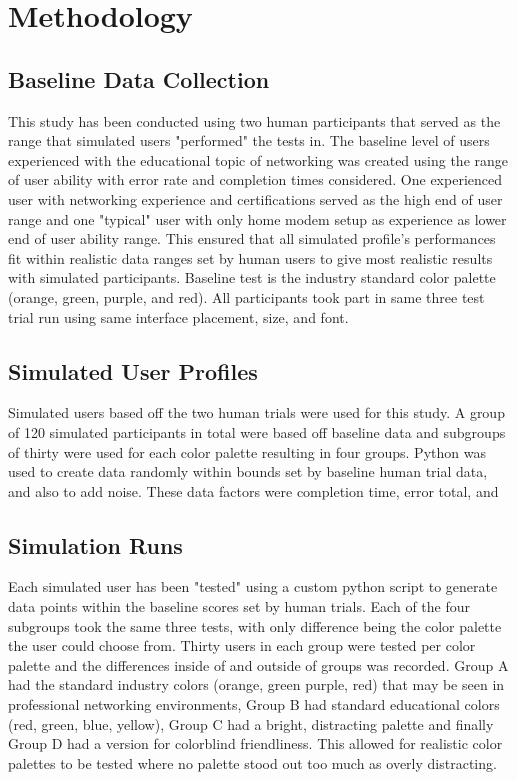 \documentclass[acmlarge]{acmart}
\begin{document}
\section{Methodology}
\subsection{Baseline Data Collection}
This study has been conducted using two human participants that served as the range that simulated users "performed" the tests in. The baseline level of users experienced with the educational topic of networking was created using the range of user ability with error rate and completion times considered. One experienced user with networking experience and certifications served as the high end of user range and one "typical" user with only home modem setup as experience as lower end of user ability range. This ensured that all simulated profile's performances fit within realistic data ranges set by human users to give most realistic results with simulated participants. Baseline test is  the industry standard color palette (orange, green, purple, and red). All participants took part in same three test trial run using same interface placement, size, and font.

\subsection{Simulated User Profiles}
Simulated users based off the two human trials were used for this study. A group of 120 simulated participants in total were based off baseline data and subgroups of thirty were used for each color palette resulting in four groups.
Python was used to create data randomly within bounds set by baseline human trial data, and also to add noise. These data factors were completion time, error total, and 

\subsection{Simulation Runs}
Each simulated user has been "tested" using a custom python script to generate data points within the baseline scores set by human trials. Each of the four subgroups took the same three tests, with only difference being the color palette the user could choose from. Thirty users in each group were tested per color palette and the differences inside of and outside of groups was recorded. Group A had the standard industry colors (orange, green purple, red) that may be seen in professional networking environments, Group B had standard educational colors (red, green, blue, yellow), Group C had a bright, distracting palette and finally Group D had a version for colorblind friendliness. This allowed for realistic color palettes to be tested where no palette stood out too much as overly distracting.
\end{document}
